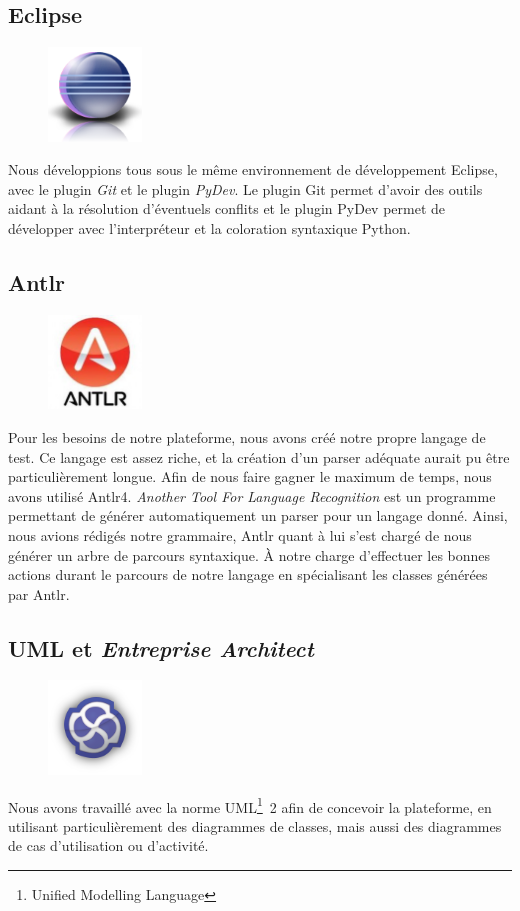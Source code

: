 \subsection{Eclipse}
\begin{figure}
	\vspace{-30px}
	\includegraphics[width=2.5cm]{contents/images/logoEclipse.png}
\end{figure}
Nous développions tous sous le même environnement de développement Eclipse, avec le plugin \textit{Git} et le plugin \textit{PyDev}. Le
plugin Git permet d'avoir des outils aidant à la résolution d'éventuels conflits et le plugin PyDev permet de développer avec l'interpréteur
et la coloration syntaxique Python. 

\subsection{Antlr}
\begin{figure}
	\includegraphics[width=2.5cm]{contents/images/antlr.jpg}
\end{figure}
Pour les besoins de notre plateforme, nous avons créé notre propre langage de test. Ce langage est assez riche, et la création d'un parser adéquate aurait pu être particulièrement longue. Afin de nous faire gagner le maximum de temps, nous avons utilisé Antlr4.  \textit{Another Tool For Language Recognition} est un programme permettant de générer automatiquement un parser pour un langage donné. Ainsi, nous avions rédigés notre grammaire, Antlr quant à lui s'est chargé de nous générer un arbre de parcours syntaxique. À notre charge d'effectuer les bonnes actions durant le parcours de notre langage en spécialisant les classes générées par Antlr.
\newpage
\subsection{UML et \textit{Entreprise Architect}}
\begin{figure}
	\includegraphics[width=2.5cm]{contents/images/logoEnterpriseArchitect.png}
\end{figure}
Nous avons travaillé avec la norme UML\footnote{Unified Modelling Language}~2 afin de concevoir la plateforme, en utilisant particulièrement des diagrammes de classes, mais aussi des diagrammes de cas d'utilisation ou d'activité. 

